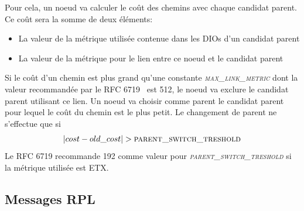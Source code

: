             Pour cela, un noeud va calculer le coût des chemins avec chaque candidat parent. Ce coût sera la somme de deux éléments:
            \begin{itemize}
                \item La valeur de la métrique utilisée contenue dans les DIOs d'un candidat parent
                \item La valeur de la métrique pour le lien entre ce noeud et le candidat parent
            \end{itemize}
            Si le coût d'un chemin est plus grand qu'une constante \textsl{\textsc{max\_link\_metric}} dont la valeur recommandée par le RFC 6719~\cite{rfc:mrhof} est 512,
            le noeud va exclure le candidat parent utilisant ce lien.
            Un noeud va choisir comme parent le candidat parent pour lequel le coût du chemin est le plus petit. Le changement de parent ne s'effectue que si 
            \[ |cost-old\_cost| > \textsc{parent\_switch\_treshold} \]
            Le RFC 6719 recommande 192 comme valeur pour \textsl{\textsc{parent\_switch\_treshold}} si la métrique utilisée est ETX.

\subsection*{Messages RPL}

